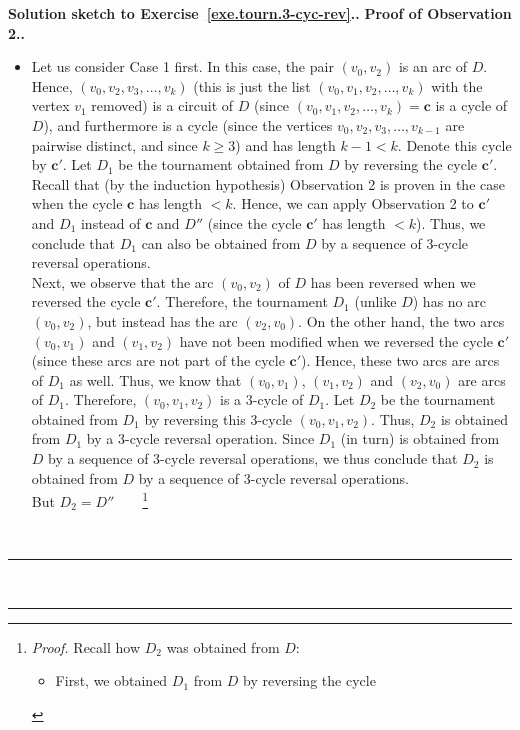 \documentclass[numbers=enddot,12pt,final,onecolumn,notitlepage]{scrartcl}%
\theoremstyle{definition}
\newenvironment{proof}[1][Proof]{\noindent\textbf{#1.} }{\ \rule{0.5em}{0.5em}}
\newcommand{\tup}[1]{\left( #1 \right)}
\begin{document}
\begin{proof}[Solution sketch to Exercise~\ref{exe.tourn.3-cyc-rev}.]
\begin{proof}[Proof of Observation 2.]
\begin{itemize}
\item Let us consider Case 1 first. In this case, the pair
      $\tup{v_0, v_2}$ is an arc of $D$. Hence,
      $\tup{v_0, v_2, v_3, \ldots, v_k}$ (this is just the list
      $\tup{v_0, v_1, v_2, \ldots, v_k}$ with the vertex $v_1$
      removed) is a circuit of $D$ (since
      $\tup{v_0, v_1, v_2, \ldots, v_k} = \mathbf{c}$ is a cycle of
      $D$), and furthermore is a cycle (since the vertices
      $v_0, v_2, v_3, \ldots, v_{k-1}$ are pairwise distinct, and
      since $k \geq 3$) and has
      length $k-1 < k$. Denote this cycle by $\mathbf{c}'$.
      Let $D_1$ be the tournament obtained from $D$ by
      reversing the cycle $\mathbf{c}'$. \\
      Recall that (by the induction hypothesis) Observation 2 is
      proven in the case when the cycle $\mathbf{c}$ has length $< k$.
      Hence, we can apply Observation 2 to $\mathbf{c}'$ and $D_1$
      instead of $\mathbf{c}$ and $D''$ (since the cycle $\mathbf{c}'$
      has length $< k$). Thus, we conclude that $D_1$ can also be
      obtained from $D$ by a sequence of $3$-cycle reversal
      operations. \\
      Next, we observe that the arc $\tup{v_0, v_2}$ of $D$ has been
      reversed when we reversed the cycle $\mathbf{c}'$. Therefore,
      the tournament $D_1$ (unlike $D$) has no arc $\tup{v_0, v_2}$,
      but instead has the arc $\tup{v_2, v_0}$. On the other hand, the
      two arcs $\tup{v_0, v_1}$ and $\tup{v_1, v_2}$ have not been
      modified when we reversed the cycle $\mathbf{c}'$ (since these
      arcs are not part of the cycle $\mathbf{c}'$). Hence, these two
      arcs are arcs of $D_1$ as well. Thus, we know that
      $\tup{v_0, v_1}$, $\tup{v_1, v_2}$ and $\tup{v_2, v_0}$ are arcs
      of $D_1$. Therefore, $\tup{v_0, v_1, v_2}$ is a $3$-cycle of
      $D_1$. Let $D_2$ be the tournament obtained from $D_1$ by
      reversing this $3$-cycle $\tup{v_0, v_1, v_2}$. Thus, $D_2$ is
      obtained from $D_1$ by a $3$-cycle reversal operation.
      Since $D_1$ (in turn) is obtained from $D$ by a sequence of
      $3$-cycle reversal operations,
      we thus conclude that $D_2$ is obtained from $D$ by a sequence
      of $3$-cycle reversal operations.\\
      But $D_2 = D''$\ \ \ \ \footnote{\textit{Proof.} Recall how
      $D_2$ was obtained from $D$:
      \begin{itemize}
      \item First, we obtained $D_1$ from $D$ by reversing the cycle

\end{itemize}}
\end{itemize}
\end{proof}
\end{proof}
\end{document}
